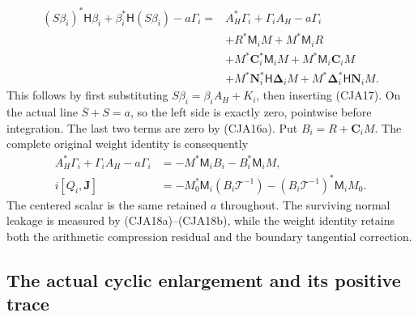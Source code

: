 \begin{equation}
 \begin{split}
 (S\beta_i)^*\mathsf H\beta_i+\beta_i^*\mathsf H(S\beta_i)-a\Gamma_i
 ={}&A_H^*\Gamma_i+\Gamma_iA_H-a\Gamma_i\\
 &+R^*\mathsf M_iM+M^*\mathsf M_iR\\
 &+M^*\boldsymbol C_i^*\mathsf M_iM
       +M^*\mathsf M_i\boldsymbol C_iM\\
 &+M^*\boldsymbol N_i^*\mathsf H\boldsymbol\Delta_iM
       +M^*\boldsymbol\Delta_i^*\mathsf H\boldsymbol N_iM .
 \end{split}
 \tag{CJA19}
\end{equation}
This follows by first substituting
\(S\beta_i=\beta_iA_H+K_i\), then inserting (CJA17).
On the actual line \(\overline S+S=a\), so the left side is
exactly zero, pointwise before integration.  The last two terms
are zero by (CJA16a).  Put \(B_i=R+\boldsymbol C_iM\).
The complete original weight identity is consequently
\begin{equation}
 \begin{split}
 A_H^*\Gamma_i+\Gamma_iA_H-a\Gamma_i
   &=-M^*\mathsf M_iB_i-B_i^*\mathsf M_iM,\\
 i[Q_i,\mathbf J]
   &=-M_0^*\mathsf M_i(B_i\mathcal T^{-1})
       -(B_i\mathcal T^{-1})^*\mathsf M_iM_0 .
 \end{split}
 \tag{CJA19a}
\end{equation}
The centered scalar is the same retained \(a\) throughout.
The surviving normal leakage is measured by (CJA18a)--(CJA18b),
while the weight identity retains both the arithmetic compression
residual and the boundary tangential correction.

\subsection{The actual cyclic enlargement and its positive trace}

